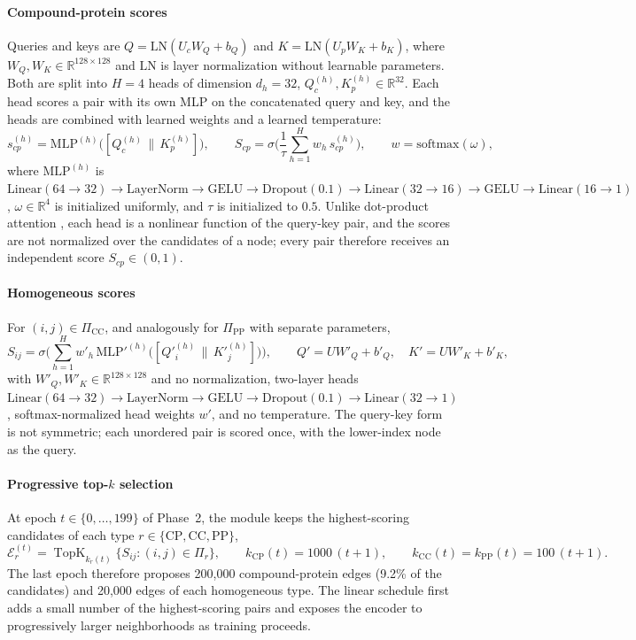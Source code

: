 \documentclass[11pt,letterpaper]{article}
\begin{document}
\paragraph{Compound-protein scores}
Queries and keys are $Q=\mathrm{LN}(U_c W_Q+b_Q)$ and $K=\mathrm{LN}(U_p W_K+b_K)$, where $W_Q,W_K\in\mathbb{R}^{128\times128}$ and $\mathrm{LN}$ is layer normalization without learnable parameters. Both are split into $H=4$ heads of dimension $d_h=32$, $Q^{(h)}_c,K^{(h)}_p\in\mathbb{R}^{32}$. Each head scores a pair with its own MLP on the concatenated query and key, and the heads are combined with learned weights and a learned temperature:
\begin{equation}
s^{(h)}_{cp} = \mathrm{MLP}^{(h)}\big([Q_c^{(h)}\,\|\,K_p^{(h)}]\big),
\qquad
S_{cp} = \sigma\!\Big(\frac{1}{\tau}\sum_{h=1}^{H} w_h\, s^{(h)}_{cp}\Big),
\qquad w=\mathrm{softmax}(\omega),
\label{eq:softedge}
\end{equation}
where $\mathrm{MLP}^{(h)}$ is $\mathrm{Linear}(64\to32)\to\mathrm{LayerNorm}\to\mathrm{GELU}\to\mathrm{Dropout}(0.1)\to\mathrm{Linear}(32\to16)\to\mathrm{GELU}\to\mathrm{Linear}(16\to1)$, $\omega\in\mathbb{R}^{4}$ is initialized uniformly, and $\tau$ is initialized to $0.5$. Unlike dot-product attention \cite{vaswani2017attention}, each head is a nonlinear function of the query-key pair, and the scores are not normalized over the candidates of a node; every pair therefore receives an independent score $S_{cp}\in(0,1)$.

\paragraph{Homogeneous scores}
For $(i,j)\in\Pi_{\text{CC}}$, and analogously for $\Pi_{\text{PP}}$ with separate parameters,
\[
S_{ij} = \sigma\!\Big(\sum_{h=1}^{H} w'_h\, \mathrm{MLP}'^{(h)}\big([Q'^{(h)}_i\,\|\,K'^{(h)}_j]\big)\Big),
\qquad Q'=UW'_Q+b'_Q,\quad K'=UW'_K+b'_K,
\]
with $W'_Q,W'_K\in\mathbb{R}^{128\times128}$ and no normalization, two-layer heads $\mathrm{Linear}(64\to32)\to\mathrm{LayerNorm}\to\mathrm{GELU}\to\mathrm{Dropout}(0.1)\to\mathrm{Linear}(32\to1)$, softmax-normalized head weights $w'$, and no temperature. The query-key form is not symmetric; each unordered pair is scored once, with the lower-index node as the query.

\paragraph{Progressive top-$k$ selection}
At epoch $t\in\{0,\dots,199\}$ of Phase~2, the module keeps the highest-scoring candidates of each type $r\in\{\text{CP},\text{CC},\text{PP}\}$,
\[
\mathcal{E}^{(t)}_r = \operatorname{TopK}_{k_r(t)}\big\{S_{ij} : (i,j)\in\Pi_r\big\},
\qquad k_{\text{CP}}(t)=1000\,(t+1),\qquad k_{\text{CC}}(t)=k_{\text{PP}}(t)=100\,(t+1).
\]
The last epoch therefore proposes 200,000 compound-protein edges (9.2\% of the candidates) and 20,000 edges of each homogeneous type. The linear schedule first adds a small number of the highest-scoring pairs and exposes the encoder to progressively larger neighborhoods as training proceeds.
\end{document}
